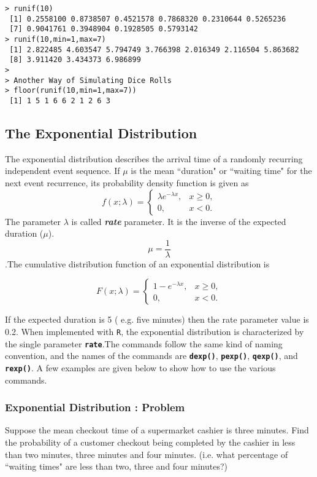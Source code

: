 \documentclass[a4paper,12pt]{article}
\begin{document}
\begin{verbatim}
> runif(10)
 [1] 0.2558100 0.8738507 0.4521578 0.7868320 0.2310644 0.5265236
 [7] 0.9041761 0.3948904 0.1928505 0.5793142
> runif(10,min=1,max=7)
 [1] 2.822485 4.603547 5.794749 3.766398 2.016349 2.116504 5.863682
 [8] 3.911420 3.434373 6.986899
>
> Another Way of Simulating Dice Rolls
> floor(runif(10,min=1,max=7))
 [1] 1 5 1 6 6 2 1 2 6 3
\end{verbatim}

\newpage
\subsection{The Exponential Distribution}

The exponential distribution describes the arrival time of a randomly recurring independent event sequence. If $\mu$ is the mean ``duration" or ``waiting time" for the next event recurrence, its probability density function is given as
\[
f(x;\lambda) = \begin{cases}
\lambda e^{-\lambda x}, & x \ge 0, \\
0, & x < 0.
\end{cases}\]
The parameter $\lambda$  is called \textbf{\emph{rate}} parameter. It is the inverse of the expected duration ($\mu$).\\
\[\mu= \frac{1}{\lambda}\].The cumulative distribution function of an exponential distribution is

\[
F(x;\lambda) = \begin{cases}
1-e^{-\lambda x}, & x \ge 0, \\
0, & x < 0.
\end{cases}\]

If the expected duration is 5 ( e.g. five minutes) then the rate parameter value is 0.2. When implemented with \texttt{R}, the exponential distribution is characterized by the single parameter \texttt{\textbf{rate}}.The commands follow the same kind of naming convention, and the names of the commands are \texttt{\textbf{dexp()}}, \texttt{\textbf{pexp()}}, \texttt{\textbf{qexp()}}, and \texttt{\textbf{rexp()}}. A few examples are given below to show how to use the various commands. 

\subsubsection{Exponential Distribution : Problem}
Suppose the mean checkout time of a supermarket cashier is three minutes. Find the probability of a customer checkout being completed by the cashier in less than two minutes, three minutes and four minutes. 
(i.e. what percentage of ``waiting times" are less than two, three and four minutes?)
\end{document}
